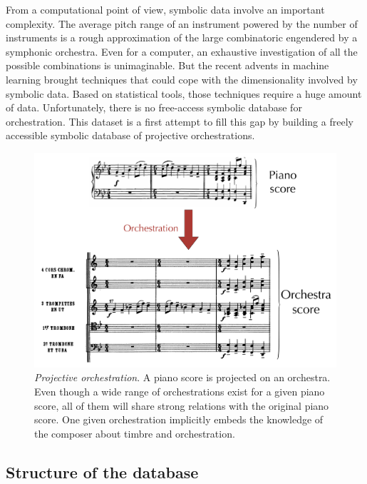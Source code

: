 \documentclass[twoside,twocolumn]{article}
\begin{document}
From a computational point of view, symbolic data involve an important complexity.
The average pitch range of an instrument powered by the number of instruments is a rough approximation of the large combinatoric engendered by a symphonic orchestra. Even for a computer, an exhaustive investigation of all the possible combinations is unimaginable.
But the recent advents in machine learning brought techniques that could cope with the dimensionality involved by symbolic data.
Based on statistical tools, those techniques require a huge amount of data. Unfortunately, there is no free-access symbolic database for orchestration.
This dataset is a first attempt to fill this gap by building a freely accessible symbolic database of projective orchestrations.

\begin{figure}
\centering
\includegraphics[scale=0.14]{Data_representation/orch}
\caption{\textit{Projective orchestration}. A piano score is projected on an orchestra. Even though a wide range of orchestrations exist for a given piano score, all of them will share strong relations with the original piano score. One given orchestration implicitly embeds the knowledge of the composer about timbre and orchestration.}
\label{fig:orch}
\end{figure}

\subsection{Structure of the database}
\end{document}
